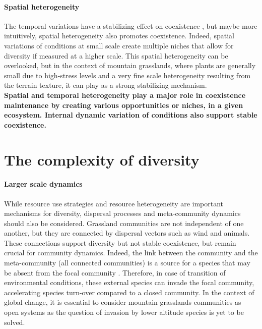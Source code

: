  
\paragraph{Spatial heterogeneity}

The temporal variations have a stabilizing effect on coexistence \parencite{tilman_plant_1984}, but maybe more intuitively, spatial heterogeneity also promotes coexistence. Indeed, spatial variations of conditions at small scale create multiple niches that allow for diversity if measured at a higher scale. This spatial heterogeneity can be overlooked, but in the context of mountain grasslands, where plants are generally small due to high-stress levels and a very fine scale heterogeneity resulting from the terrain texture, it can play as a strong stabilizing mechanism.\\

%

\textbf{Spatial and temporal heterogeneity play a major role in coexistence maintenance by creating various opportunities or niches, in a given ecosystem. Internal dynamic variation of conditions also support stable coexistence.}

\section{The complexity of diversity}

\paragraph{Larger scale dynamics}

While resource use strategies and resource heterogeneity are important mechanisms for diversity, dispersal processes and meta-community dynamics should also be considered. Grassland communities are not independent of one another, but they are connected by dispersal vectors such as wind and animals. These connections support diversity but not stable coexistence, but remain crucial for community dynamics. Indeed, the link between the community and the meta-community (all connected communities) is a source for a species that may be absent from the focal community \parencite{alexander_plant_2016}. Therefore, in case of transition of environmental conditions, these external species can invade the focal community, accelerating species turn-over compared to a closed community. In the context of global change, it is essential to consider mountain grasslands communities as open systems as the question of invasion by lower altitude species is yet to be solved.

